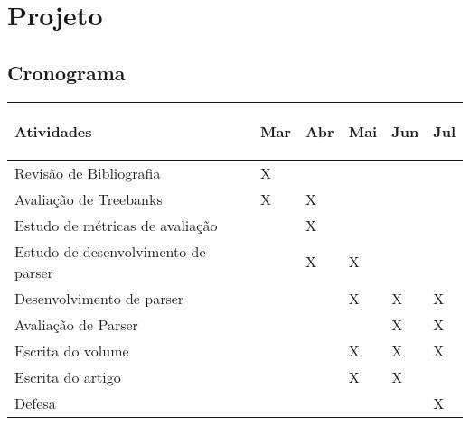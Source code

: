 \chapter{Projeto}

\section{Cronograma}

\begin{tabular}{|l|l|l|l|l|l|}
\hline
\label{tab: crono}
 	
	Atividades & Mar & Abr & Mai & Jun & Jul \\ \hline
    Revisão de Bibliografia & X & \space &\space & \space & \space \\ \hline    
    Avaliação de Treebanks  & X & X &\space & \space & \space \\ \hline    
    Estudo de métricas de avaliação  & \space & X &\space & \space & \space \\ \hline    
    Estudo de desenvolvimento de parser  & \space & X & X & \space & \space \\ \hline    
    Desenvolvimento de parser  & \space & \space & X & X & X \\ \hline   
    Avaliação de Parser & \space & \space & \space & X & X \\ \hline
    Escrita do volume & \space & \space & X & X & X \\ \hline
    Escrita do artigo & \space & \space & X & X & \space \\ \hline
    Defesa & \space & \space & \space & \space & X \\ \hline       
    
\end{tabular}